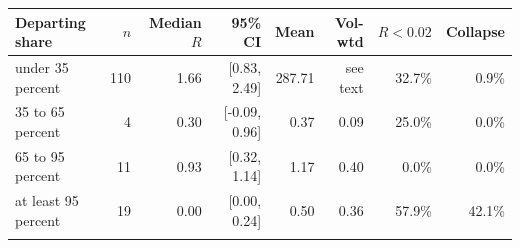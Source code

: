 \begin{tabular}{@{}lrrrrrrr@{}}
\toprule
Departing share & $n$ & Median $R$ & 95\% CI & Mean & Vol-wtd & $R<0.02$ & Collapse \\
\midrule
under 35 percent    & 110 & 1.66 & [0.83, 2.49] & 287.71 & see text & 32.7\% & 0.9\% \\
35 to 65 percent    & 4 & 0.30 & [-0.09, 0.96] & 0.37 & 0.09 & 25.0\% & 0.0\% \\
65 to 95 percent    & 11 & 0.93 & [0.32, 1.14] & 1.17 & 0.40 & 0.0\% & 0.0\% \\
at least 95 percent & 19 & 0.00 & [0.00, 0.24] & 0.50 & 0.36 & 57.9\% & 42.1\% \\
\botrule
\end{tabular}